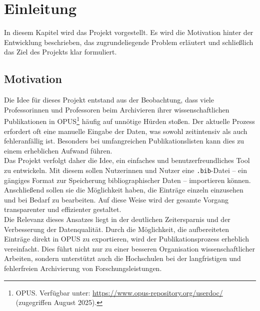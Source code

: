 \chapter{Einleitung}
In diesem Kapitel wird das Projekt vorgestellt. Es wird die Motivation 
hinter der Entwicklung beschrieben, das zugrundeliegende Problem erläutert
und schließlich das Ziel des Projekts klar formuliert. 

\section{Motivation}
Die Idee für dieses Projekt entstand aus der Beobachtung, dass viele 
Professorinnen und Professoren beim Archivieren ihrer wissenschaftlichen 
Publikationen in OPUS\footnote{OPUS. Verfügbar unter: 
\url{https://www.opus-repository.org/userdoc/} (zugegriffen August 2025).} 
häufig auf unnötige Hürden stoßen. Der aktuelle Prozess 
erfordert oft eine manuelle Eingabe der Daten, was sowohl zeitintensiv 
als auch fehleranfällig ist. Besonders bei umfangreichen Publikationslisten 
kann dies zu einem erheblichen Aufwand führen.\\

\noindent Das Projekt verfolgt daher die Idee, ein einfaches und 
benutzerfreundliches Tool zu entwickeln. Mit diesem sollen Nutzerinnen und 
Nutzer eine \texttt{.bib}-Datei – ein gängiges Format zur Speicherung 
bibliographischer Daten – importieren können. Anschließend sollen sie die 
Möglichkeit haben, die Einträge einzeln einzusehen und bei Bedarf zu 
bearbeiten. Auf diese Weise wird der gesamte Vorgang transparenter und 
effizienter gestaltet.\\

\noindent Die Relevanz dieses Ansatzes liegt in der deutlichen Zeitersparnis und der 
Verbesserung der Datenqualität. Durch die Möglichkeit, die aufbereiteten 
Einträge direkt in OPUS zu exportieren, wird der Publikationsprozess 
erheblich vereinfacht. Dies führt nicht nur zu einer besseren Organisation 
wissenschaftlicher Arbeiten, sondern unterstützt auch die Hochschulen bei 
der langfristigen und fehlerfreien Archivierung von Forschungsleistungen.

